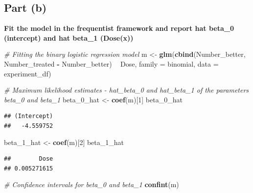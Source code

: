 \documentclass[
]{article}
\newenvironment{Shaded}{\begin{snugshade}}{\end{snugshade}}
\newcommand{\CommentTok}[1]{\textcolor[rgb]{0.56,0.35,0.01}{\textit{#1}}}
\newcommand{\DataTypeTok}[1]{\textcolor[rgb]{0.13,0.29,0.53}{#1}}
\newcommand{\DecValTok}[1]{\textcolor[rgb]{0.00,0.00,0.81}{#1}}
\newcommand{\KeywordTok}[1]{\textcolor[rgb]{0.13,0.29,0.53}{\textbf{#1}}}
\newcommand{\NormalTok}[1]{#1}
\newcommand{\OperatorTok}[1]{\textcolor[rgb]{0.81,0.36,0.00}{\textbf{#1}}}
\newcommand{\StringTok}[1]{\textcolor[rgb]{0.31,0.60,0.02}{#1}}
\begin{document}
\hypertarget{part-b-1}{%
\subsection{\texorpdfstring{\textbf{Part
(b)}}{Part (b)}}\label{part-b-1}}

\textbf{Fit the model in the frequentist framework and report hat
beta\_0 (intercept) and hat beta\_1 (Dose(x))}

\begin{Shaded}
\begin{Highlighting}[]
\CommentTok{# Fitting the binary logistic regression model}
\NormalTok{m <-}\StringTok{ }\KeywordTok{glm}\NormalTok{(}\KeywordTok{cbind}\NormalTok{(Number_better, }
\NormalTok{               Number_treated }\OperatorTok{-}\StringTok{ }\NormalTok{Number_better) }\OperatorTok{~}\StringTok{ }\NormalTok{Dose, }
         \DataTypeTok{family =}\NormalTok{ binomial, }
         \DataTypeTok{data =}\NormalTok{ experiment_df)}

\CommentTok{# Maximum likelihood estimates - hat_beta_0 and hat_beta_1 of the parameters beta_0 and beta_1}
\NormalTok{beta_}\DecValTok{0}\NormalTok{_hat <-}\StringTok{ }\KeywordTok{coef}\NormalTok{(m)[}\DecValTok{1}\NormalTok{]}
\NormalTok{beta_}\DecValTok{0}\NormalTok{_hat}
\end{Highlighting}
\end{Shaded}

\begin{verbatim}
## (Intercept) 
##   -4.559752
\end{verbatim}

\begin{Shaded}
\begin{Highlighting}[]
\NormalTok{beta_}\DecValTok{1}\NormalTok{_hat <-}\StringTok{ }\KeywordTok{coef}\NormalTok{(m)[}\DecValTok{2}\NormalTok{]}
\NormalTok{beta_}\DecValTok{1}\NormalTok{_hat}
\end{Highlighting}
\end{Shaded}

\begin{verbatim}
##        Dose 
## 0.005271615
\end{verbatim}

\begin{Shaded}
\begin{Highlighting}[]
\CommentTok{# Confidence intervals for beta_0 and beta_1}
\KeywordTok{confint}\NormalTok{(m)}
\end{Highlighting}
\end{Shaded}
\end{document}
